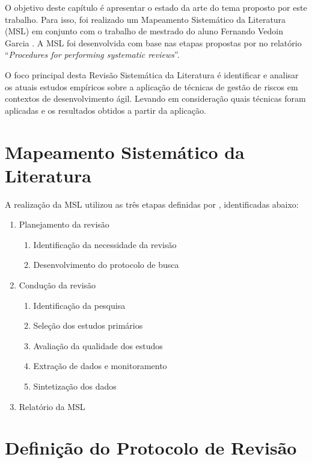 \documentclass[
    12pt,       %
    openright,      %
    twoside,      %
    a4paper,      %
    english,      %
    french,       %
    spanish,      %
    brazil,       %
    ]{abntex2}
\begin{document}
O objetivo deste capítulo é apresentar o estado da arte do tema proposto por este trabalho. Para isso, foi realizado um Mapeamento Sistemático da Literatura (MSL) em conjunto com o trabalho de mestrado do aluno Fernando Vedoin Garcia \cite{GARCIA:2021}. A MSL foi desenvolvida com base nas etapas propostas por  no relatório ``\textit{Procedures for performing systematic reviews}''. 

O foco principal desta Revisão Sistemática da Literatura é identificar e analisar os atuais estudos empíricos sobre a aplicação de técnicas de gestão de riscos em contextos de desenvolvimento ágil. Levando em consideração quais técnicas foram aplicadas e os resultados obtidos a partir da aplicação.

\section{Mapeamento Sistemático da Literatura}

A realização da MSL utilizou as três etapas definidas por , identificadas abaixo: 

\begin{enumerate}
    \item Planejamento da revisão
        \begin{enumerate}
            \item Identificação da necessidade da revisão
            \item Desenvolvimento do protocolo de busca
        \end{enumerate}
    \item Condução da revisão
        \begin{enumerate}
            \item Identificação da pesquisa
            \item Seleção dos estudos primários
            \item Avaliação da qualidade dos estudos
            \item Extração de dados e monitoramento
            \item Sintetização dos dados
        \end{enumerate}
    \item Relatório da MSL
\end{enumerate}

\section{Definição do Protocolo de Revisão}
\end{document}
